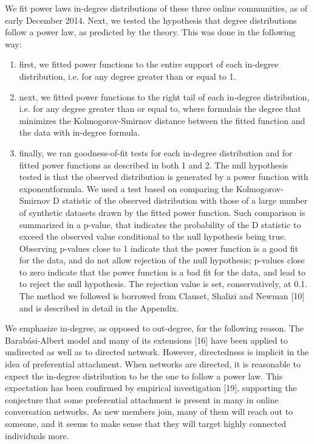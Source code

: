 We fit power laws in-degree distributions of these three online communities, as of early December 2014. Next, we tested the hypothesis that degree distributions follow a power law, as predicted by the theory. This was done in the following way:
\begin{enumerate}
\item first, we fitted power functions to the entire support of each in-degree distribution, i.e. for any degree greater than or equal to 1. 
\item next, we fitted power functions to the right tail of each in-degree distribution, i.e. for any degree greater than or equal to, where formulais the degree that minimizes the Kolmogorov-Smirnov distance between the fitted function and the data with in-degree formula.
\item finally, we ran goodness-of-fit tests for each in-degree distribution and for fitted power functions as described in both 1 and 2. The null hypothesis tested is that the observed distribution is generated by a power function with exponentformula. We used a test based on comparing the Kolmogorov-Smirnov D statistic of the observed distribution with those of a large number of synthetic datasets drawn by the fitted power function. Such comparison is summarized in a p-value, that indicates the probability of the D statistic to exceed the observed value conditional to the null hypothesis being true. Observing p-values close to 1 indicate that the power function is a good fit for the data, and do not allow rejection of the null hypothesis; p-values close to zero indicate that the power function is a bad fit for the data, and lead to to reject the null hypothesis. The rejection value is set, conservatively, at 0.1.  The method we followed is borrowed from Clauset, Shalizi and Newman [10] and is described in detail in the Appendix. 
\end{enumerate}
	
We emphasize in-degree, as opposed to out-degree, for the following reason. The Barabási-Albert model and many of its extensions [16] have been applied to undirected as well as to directed network. However, directedness is implicit in the idea of preferential attachment. When networks are directed, it is reasonable to expect the in-degree distribution to be the one to follow a power law. This expectation has been confirmed by empirical investigation [19], supporting the conjecture that some preferential attachment is present in many in online conversation networks. As new members join, many of them will reach out to someone, and it seems to make sense that they will target highly connected individuals more. 

